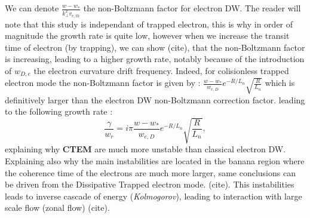 \documentclass[11pt,a4paper]{report}
\begin{document}
\begin{multicols}{2}
    We can denote $\frac{w-w_*}{k_\perp^2v_{e,th}}$ the non-Boltzmann factor for electron DW. The reader will note that this study is independant of trapped electron, this is why in order of magnitude the growth rate is quite low, however when we increase the transit time of electron (by trapping),
    we can show (cite), that the non-Boltzmann factor is increasing, leading to a higher growth rate, notably because of the introduction of $w_{D,e}$ the electron curvature drift frequency. Indeed, for colisionless trapped electron mode the non-Boltzmann factor is given by : $\frac{w - w_*}{w_{e,D}}e^{-R/L_n}\sqrt{\frac{R}{L_n}}$ which is definitively larger than the electron DW non-Boltzmann correction factor.
    leading to the following growth rate : $$\frac{\gamma}{w_r} = i \pi \frac{w - w_*}{w_{e,D}}e^{-R/L_n}\sqrt{\frac{R}{L_n}},$$ explaining why \textbf{CTEM} are much more unstable than classical electron DW. Explaining also why the main instabilities are located in the banana region where the coherence time of the electrons are much more larger, same conclusions can be driven from the Dissipative Trapped electron mode. (cite). This instabilities leads to inverse cascade of energy (\emph{Kolmogorov}), leading to interaction with large scale flow (zonal flow) (cite).
\end{multicols}
\end{document}
